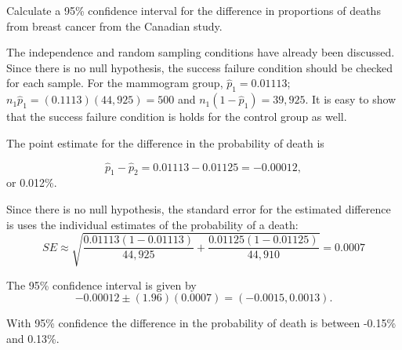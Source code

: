 \begin{example}{Calculate a 95\% confidence interval for the difference in proportions of deaths from breast cancer from the Canadian study.}

\label{mammogramExConfInt}

The independence and random sampling conditions have already been discussed.  Since there is no null hypothesis, the success failure condition should be checked for each sample.  For the mammogram group, $\hat{p}_1 = 0.01113$; $n_1 \hat{p}_1 = (0.1113)(44,925) = 500$ and $n_1 (1 - \hat{p}_1) = 39,925.$ It is easy to show that the success failure condition is holds for the control group as well.

The point estimate for the difference in the probability of death is

$$\hat{p}_{1} - \hat{p}_{2} = 0.01113 - 0.01125 = -0.00012,$$ or 0.012\%.

Since there is no null hypothesis, the standard error for the estimated difference is uses the individual estimates of the probability of a death:
$$SE \approx \sqrt{\frac{0.01113(1-0.01113)}{44,925} + \frac{0.01125(1-0.01125)}{44,910}} = 0.0007 $$

The 95\% confidence interval is given by 
$$ -0.00012 \pm (1.96) (0.0007) = (-0.0015, 0.0013).$$

With 95\% confidence the difference in the probability of death is between -0.15\% and 0.13\%. 

\end{example}





